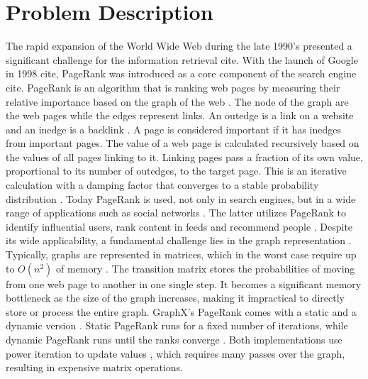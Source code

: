 \documentclass[a4paper,12pt]{article}
\begin{document}
\section{Problem Description}
The rapid expansion of the World Wide Web during the late 1990's presented a significant challenge for the information retrieval cite. With the launch of Google in 1998 cite, PageRank was introduced as a core component of the search engine cite. PageRank is an algorithm that is ranking web pages by measuring their relative importance based on the graph of the web \cite{page_pagerank_1999}. The node of the graph are the web pages while the edges represent links. An outedge is a link on a website and an inedge is a backlink \cite{page_pagerank_1999}. A page is considered important if it has inedges from important pages. The value of a web page is calculated recursively based on the values of all pages linking to it. Linking pages pass a fraction of its own value, proportional to its number of outedges, to the target page. This is an iterative calculation with a damping factor that converges to a stable probability distribution \cite{page_pagerank_1999}. 
Today PageRank is used, not only in search engines, but in a wide range of applications such as social networks \cite{wu_efficient_2024}. The latter utilizes PageRank to identify influential users, rank content in feeds and recommend people \cite{weng_twitterrank_2010}. Despite its wide applicability, a fundamental challenge lies in the graph representation \cite{liu_fast_2015}. Typically, graphs are represented in matrices, which in the worst case require up to $O(n^2)$ of memory \cite{wu_efficient_2024}. The transition matrix stores the probabilities of moving from one web page to another in one single step. It becomes a significant memory bottleneck as the size of the graph increases, making it impractical to directly store or process the entire graph. GraphX's PageRank comes with a static and a dynamic version \cite{xin_graphx_2013}. Static PageRank runs for a fixed number of iterations, while dynamic PageRank runs until the ranks converge \cite{xin_graphx_2013}. Both implementations use power iteration to update values \cite{xin_graphx_2013}, which requires many passes over the graph, resulting in expensive matrix operations. %
\end{document}
